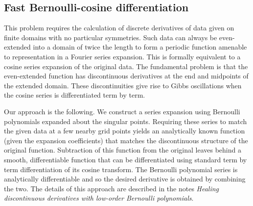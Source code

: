 \documentclass{jfm-like}
\begin{document}
\subsection{Fast Bernoulli-cosine differentiation}
This problem requires  the calculation of discrete derivatives of data given on finite domains with no particular symmetries. Such data can always be even-extended into a domain of twice the length to form
a periodic function amenable to representation in a Fourier series expansion. This is formally equivalent to a cosine series expansion of the original data. The fundamental problem is that the even-extended
function has discontinuous derivatives at the end and midpoints of the extended domain. These discontinuities give rise to Gibbs oscillations when the cosine series is differentiated term by term. 

Our approach is the following.
We construct a series expansion using Bernoulli polynomials expanded about the singular points. Requiring these series to match the given data at a few nearby grid points yields an analytically
known function (given the expansion coefficients) that matches the discontinuous structure of the original function. Subtraction of this function from the original leaves behind a smooth, differentiable
function that can be differentiated using standard term by term differentiation of its cosine transform. The Bernoulli polynomial series is analytically differentiable and so the desired derivative
is obtained by combining the two. The details of this approach are described in the notes {\em Healing discontinuous derivatives with low-order Bernoulli polynomials}.
\end{document}
